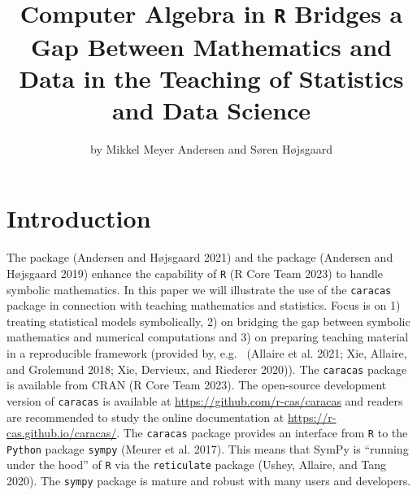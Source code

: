 \title{Computer Algebra in \texttt{R} Bridges a Gap Between Mathematics and Data in the Teaching of Statistics and Data Science}
\author{by Mikkel Meyer Andersen and Søren Højsgaard}

\maketitle


\hypertarget{introduction}{%
\section{Introduction}\label{introduction}}

The  package
(Andersen and Højsgaard 2021) and the  package (Andersen and Højsgaard 2019) enhance the capability of \texttt{R} (R Core Team 2023) to handle symbolic mathematics. In this paper
we will illustrate the use of the \texttt{caracas} package in connection with
teaching mathematics and statistics.
Focus
is on 1) treating statistical models symbolically, 2) on bridging the
gap between symbolic mathematics and numerical computations and 3) on
preparing teaching material in a reproducible framework (provided by, e.g.~
(Allaire et al. 2021; Xie, Allaire, and Grolemund 2018; Xie, Dervieux, and Riederer 2020)). The \texttt{caracas} package is available from CRAN (R Core Team 2023).
The open-source development version of \texttt{caracas} is available at
\url{https://github.com/r-cas/caracas} and readers are recommended to study the online
documentation at \url{https://r-cas.github.io/caracas/}.
The \texttt{caracas} package provides
an interface from \texttt{R} to the
\texttt{Python} package \texttt{sympy} (Meurer et al. 2017). This means that SymPy is
``running under the hood'' of \texttt{R} via the \texttt{reticulate}
package (Ushey, Allaire, and Tang 2020). The \texttt{sympy} package is mature and robust with
many users and developers.

